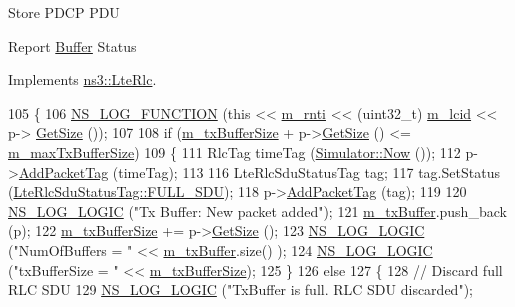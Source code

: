 Store P\+D\+CP P\+DU

Report \hyperlink{classns3_1_1Buffer}{Buffer} Status 

Implements \hyperlink{classns3_1_1LteRlc_af1e6ccdc5f9f2bee9d42a056e94351a5}{ns3\+::\+Lte\+Rlc}.


\begin{DoxyCode}
105 \{
106   \hyperlink{log-macros-disabled_8h_a90b90d5bad1f39cb1b64923ea94c0761}{NS\_LOG\_FUNCTION} (\textcolor{keyword}{this} << \hyperlink{classns3_1_1LteRlc_a48ab0a78e7f2687337075b1c8832df70}{m\_rnti} << (uint32\_t) \hyperlink{classns3_1_1LteRlc_a051085e9b27883e7ba4b98ad7242fd8a}{m\_lcid} << p->
      \hyperlink{classns3_1_1Packet_a462855c9929954d4301a4edfe55f4f1c}{GetSize} ());
107 
108   \textcolor{keywordflow}{if} (\hyperlink{classns3_1_1LteRlcUm_a22ba9f6bd98fd3b905155ae0d0182b0d}{m\_txBufferSize} + p->\hyperlink{classns3_1_1Packet_a462855c9929954d4301a4edfe55f4f1c}{GetSize} () <= \hyperlink{classns3_1_1LteRlcUm_ad65c6605ca578b8085d9f40f89265ea3}{m\_maxTxBufferSize})
109     \{
111       RlcTag timeTag (\hyperlink{classns3_1_1Simulator_ac3178fa975b419f7875e7105be122800}{Simulator::Now} ());
112       p->\hyperlink{classns3_1_1Packet_a7400b8655852f5271c5957250d0141af}{AddPacketTag} (timeTag);
113 
116       LteRlcSduStatusTag tag;
117       tag.SetStatus (\hyperlink{classns3_1_1LteRlcSduStatusTag_ae7822c5cc0d54a3d193b09a91ed6f133ade41b0025c66cd211e992196f314d4a5}{LteRlcSduStatusTag::FULL\_SDU});
118       p->\hyperlink{classns3_1_1Packet_a7400b8655852f5271c5957250d0141af}{AddPacketTag} (tag);
119 
120       \hyperlink{group__logging_ga88acd260151caf2db9c0fc84997f45ce}{NS\_LOG\_LOGIC} (\textcolor{stringliteral}{"Tx Buffer: New packet added"});
121       \hyperlink{classns3_1_1LteRlcUm_ac2c10aa57585dbea3797d651f3dce7be}{m\_txBuffer}.push\_back (p);
122       \hyperlink{classns3_1_1LteRlcUm_a22ba9f6bd98fd3b905155ae0d0182b0d}{m\_txBufferSize} += p->\hyperlink{classns3_1_1Packet_a462855c9929954d4301a4edfe55f4f1c}{GetSize} ();
123       \hyperlink{group__logging_ga88acd260151caf2db9c0fc84997f45ce}{NS\_LOG\_LOGIC} (\textcolor{stringliteral}{"NumOfBuffers = "} << \hyperlink{classns3_1_1LteRlcUm_ac2c10aa57585dbea3797d651f3dce7be}{m\_txBuffer}.size() );
124       \hyperlink{group__logging_ga88acd260151caf2db9c0fc84997f45ce}{NS\_LOG\_LOGIC} (\textcolor{stringliteral}{"txBufferSize = "} << \hyperlink{classns3_1_1LteRlcUm_a22ba9f6bd98fd3b905155ae0d0182b0d}{m\_txBufferSize});
125     \}
126   \textcolor{keywordflow}{else}
127     \{
128       \textcolor{comment}{// Discard full RLC SDU}
129       \hyperlink{group__logging_ga88acd260151caf2db9c0fc84997f45ce}{NS\_LOG\_LOGIC} (\textcolor{stringliteral}{"TxBuffer is full. RLC SDU discarded"});

\end{DoxyCode}
